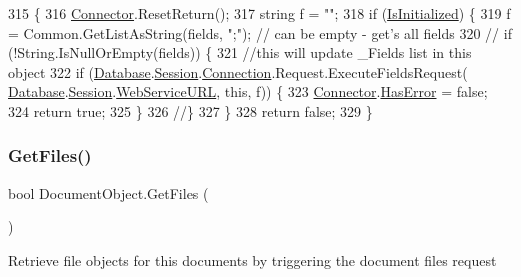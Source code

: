 \begin{DoxyCode}
315                                         \{
316         \mbox{\hyperlink{class_connector}{Connector}}.ResetReturn();
317         \textcolor{keywordtype}{string} f = \textcolor{stringliteral}{""};
318         \textcolor{keywordflow}{if} (\mbox{\hyperlink{class_document_object_a3b2075b73f38d05091b69decc6ce7992}{IsInitialized}}) \{
319             f = Common.GetListAsString(fields, \textcolor{stringliteral}{";"}); \textcolor{comment}{// can be empty - get's all fields}
320             \textcolor{comment}{// if (!String.IsNullOrEmpty(fields)) \{}
321             \textcolor{comment}{//this will update \_Fields list in this object}
322             \textcolor{keywordflow}{if} (\mbox{\hyperlink{class_document_object_a69d5338c9835f748490323d2950eed09}{Database}}.\mbox{\hyperlink{class_database_object_aa8484162b7d2a7c4c9426bca13c64c07}{Session}}.\mbox{\hyperlink{class_session_object_a014bdbf705a753540e19bfb53030c55c}{Connection}}.Request.ExecuteFieldsRequest(
      \mbox{\hyperlink{class_document_object_a69d5338c9835f748490323d2950eed09}{Database}}.\mbox{\hyperlink{class_database_object_aa8484162b7d2a7c4c9426bca13c64c07}{Session}}.\mbox{\hyperlink{class_session_object_a697c071c812fbf7ad1166b896fb44c16}{WebServiceURL}}, \textcolor{keyword}{this}, f)) \{
323                 \mbox{\hyperlink{class_connector}{Connector}}.\mbox{\hyperlink{class_connector_a9365777a6b7b711b75bcfa6c4d53e989}{HasError}} = \textcolor{keyword}{false};
324                 \textcolor{keywordflow}{return} \textcolor{keyword}{true};
325             \}
326             \textcolor{comment}{//\}}
327         \}
328         \textcolor{keywordflow}{return} \textcolor{keyword}{false};
329     \}
\end{DoxyCode}
\mbox{\label{class_document_object_a2c8aee9450e8fdd1e84e8ff26d0950a1}} 
\subsubsection{\texorpdfstring{Get\+Files()}{GetFiles()}}
{\footnotesize\ttfamily bool Document\+Object.\+Get\+Files (\begin{DoxyParamCaption}{ }\end{DoxyParamCaption})}



Retrieve file objects for this documents by triggering the document files request 

